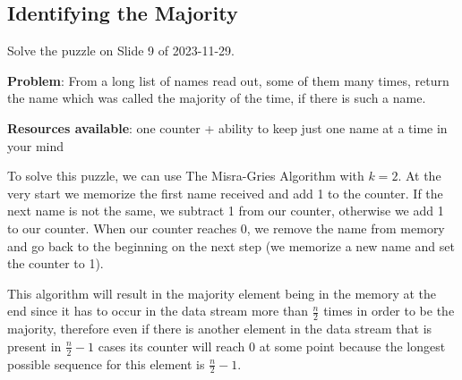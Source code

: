 \documentclass{article}
\begin{document}
  \subsection{Identifying the Majority}
  \begin{centerframebox}
    Solve the puzzle on Slide 9 of 2023-11-29.

    \textbf{Problem}: From a long list of names read out, some of them many times, return the name which was called the majority of the time, if there is such a name.

    \textbf{Resources available}: one counter + ability to keep just one name at a time in your mind
  \end{centerframebox}
  To solve this puzzle, we can use The Misra-Gries Algorithm with $k = 2$.
  At the very start we memorize the first name received and add 1 to the counter.
  If the next name is not the same, we subtract 1 from our counter, otherwise we add 1 to our counter.
  When our counter reaches 0, we remove the name from memory and go back to the beginning on the next step (we memorize a new name and set the counter to 1).

  This algorithm will result in the majority element being in the memory at the end since it has to occur in the data stream more than $\frac{n}{2}$ times in order to be the majority, therefore even if there is another element in the data stream that is present in $\frac{n}{2}-1$ cases its counter will reach 0 at some point because the longest possible sequence for this element is $\frac{n}{2}-1$.


\end{document}
